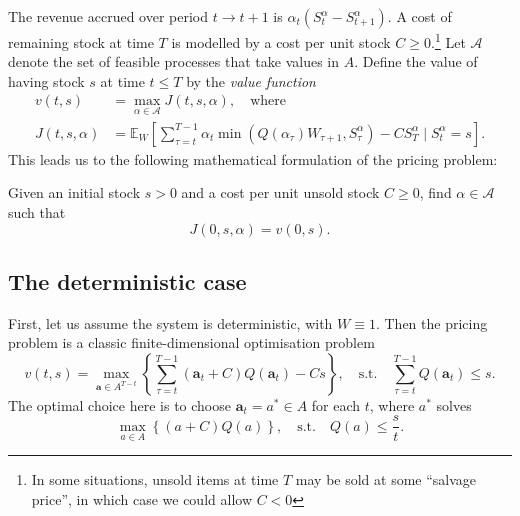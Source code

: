 \documentclass[main.tex]{subfiles}
\begin{document}
The revenue accrued over period $t\to t+1$ is $\alpha_t(S_t^\alpha-S_{t+1}^\alpha)$.
A cost of remaining stock at time $T$ is modelled by a cost per unit
stock $C\geq 0$.\footnote{In some situations, unsold items at time $T$
  may be sold at some ``salvage price'', in which case we could allow
  $C<0$}
Let $\mathcal A$ denote the set of feasible processes that take values
in $A$.
Define the value of having stock $s$ at time $t\leq T$
by the \emph{value function}
\begin{align}
  v(t,s)&=\max_{\alpha\in\mathcal A} J(t,s,\alpha),\quad\text{where}\\
  J(t,s,\alpha)&=
                 \mathbb E_{W}\left[ \sum_{\tau=t}^{T-1} \alpha_t\min(Q(\alpha_\tau)W_{\tau+1},S_\tau^\alpha) -
                 CS_T^\alpha \mid S_t^\alpha = s
                 \right].
\end{align}
This leads us to the following mathematical formulation of the pricing
problem:
\begin{mydef}
  Given an initial stock $s>0$ and a cost per unit unsold stock $C\geq
  0$, find $\alpha\in\mathcal A$ such that
  \begin{equation}
    J(0,s,\alpha) = v(0,s).
  \end{equation}
\end{mydef}

\subsection{The deterministic case}
First, let us assume the system is deterministic, with
$W\equiv 1$.
Then the pricing problem is a classic finite-dimensional optimisation
problem
\begin{equation}
  v(t,s)=\max_{\mathbf a\in A^{T-t}}\left\{\sum_{\tau=t}^{T-1}(\mathbf
    a_t+C)Q(\mathbf a_t)-Cs\right\},
  \quad \text{s.t.}\quad \sum_{\tau=t}^{T-1}Q(\mathbf a_t)\leq s.
\end{equation}
The optimal choice here is to choose $\mathbf a_t=a^*\in A$ for each
$t$, where $a^*$ solves
\begin{equation}
  \max_{a\in A} \left\{(a+C)Q(a)\right\},\quad\text{s.t.}\quad
  Q(a)\leq \frac{s}{t}.
\end{equation}
\end{document}
